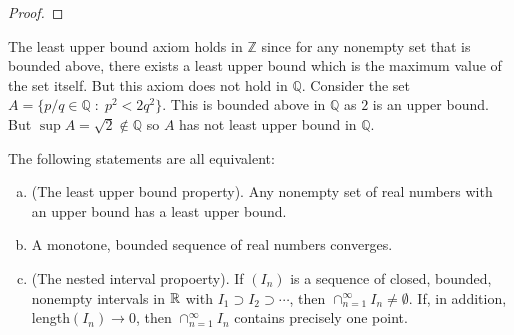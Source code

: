 \documentclass[11pt,a4paper]{article}
\begin{document}
\begin{proof}
    
\end{proof}

\begin{remark}
    The least upper bound axiom holds in $\mathbb{Z}$ since for any nonempty set that is bounded above, there exists a least upper bound which is the maximum value of the set itself. But this axiom does not hold in $\mathbb{Q}$. Consider the set $A = \{p/q\in \mathbb{Q}\;:\; p^2<2q^2\}$. This is bounded above in $\mathbb{Q}$ as $2$ is an upper bound. But $\sup A = \sqrt{2}\notin \mathbb{Q}$ so $A$ has not least upper bound in $\mathbb{Q}$. 
\end{remark}

\begin{proposition}
    The following statements are all equivalent:
    \begin{enumerate}[(a)]
        \item (The least upper bound property). Any nonempty set of real numbers with an upper bound has a least upper bound.
        \item A monotone, bounded sequence of real numbers converges.
        \item (The nested interval propoerty). If $(I_n)$ is a sequence of closed, bounded, nonempty intervals in $\mathbb{R}$ with $I_1\supset I_2\supset\cdots$, then $\cap_{n=1}^\infty I_n \neq \emptyset$. If, in addition, length$(I_n)\rightarrow 0$, then $\cap_{n=1}^\infty I_n$ contains precisely one point.
    \end{enumerate}
\end{proposition}
\end{document}
